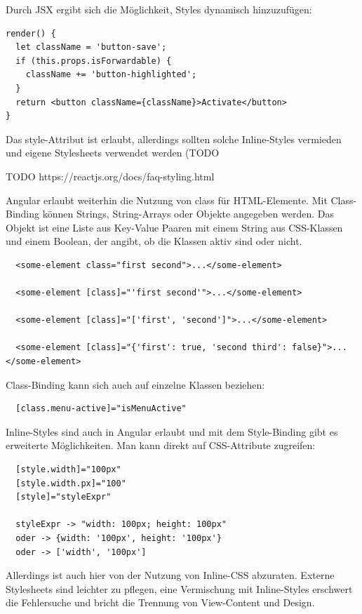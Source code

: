 Durch JSX ergibt sich die Möglichkeit, Styles dynamisch hinzuzufügen: 

\begin{verbatim}
render() {
  let className = 'button-save';
  if (this.props.isForwardable) {
    className += 'button-highlighted';
  }
  return <button className={className}>Activate</button>
}
\end{verbatim}

Das style-Attribut ist erlaubt, allerdings sollten solche Inline-Styles vermieden und eigene Stylesheets verwendet werden (TODO %

TODO https://reactjs.org/docs/faq-styling.html

Angular erlaubt weiterhin die Nutzung von class für HTML-Elemente. Mit Class-Binding können Strings, String-Arrays oder Objekte angegeben werden. Das Objekt ist eine Liste aus Key-Value Paaren mit einem String aus CSS-Klassen und einem Boolean, der angibt, ob die Klassen aktiv sind oder nicht.

\begin{verbatim}
  <some-element class="first second">...</some-element>

  <some-element [class]="'first second'">...</some-element>

  <some-element [class]="['first', 'second']">...</some-element>

  <some-element [class]="{'first': true, 'second third': false}">...</some-element>
\end{verbatim}

Class-Binding kann sich auch auf einzelne Klassen beziehen: 

\begin{verbatim}
  [class.menu-active]="isMenuActive"
\end{verbatim}

Inline-Styles sind auch in Angular erlaubt und mit dem Style-Binding gibt es erweiterte Möglichkeiten. Man kann direkt auf CSS-Attribute zugreifen: 

\begin{verbatim}
  [style.width]="100px" 
  [style.width.px]="100" 
  [style]="styleExpr"

  styleExpr -> "width: 100px; height: 100px" 
  oder -> {width: '100px', height: '100px'}
  oder -> ['width', '100px']
\end{verbatim}

Allerdings ist auch hier von der Nutzung von Inline-CSS abzuraten. Externe Stylesheets sind leichter zu pflegen, eine Vermischung mit Inline-Styles erschwert die Fehlersuche und bricht die Trennung von View-Content und Design.

